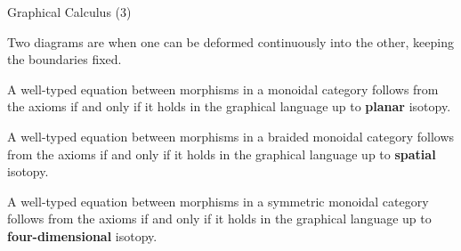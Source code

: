 \documentclass{beamer}
\begin{document}
\begin{frame}{Graphical Calculus (3)}

  \begin{definition}
    Two diagrams are  when one can be deformed continuously into the other, keeping the boundaries fixed.
  \end{definition}

  {
    \begin{theorem}
      A well-typed equation between morphisms in a monoidal category follows from the axioms if and only if it holds in the graphical language up to \textbf{planar} isotopy.
    \end{theorem}

    \begin{theorem}
      A well-typed equation between morphisms in a braided monoidal category follows from the axioms if and only if it holds in the graphical language up to \textbf{spatial} isotopy.
    \end{theorem}
  }

  \begin{theorem}
    A well-typed equation between morphisms in a symmetric monoidal category follows from the axioms if and only if it holds in the graphical language up to \textbf{four-dimensional} isotopy.
  \end{theorem}

\end{frame}
\end{document}
